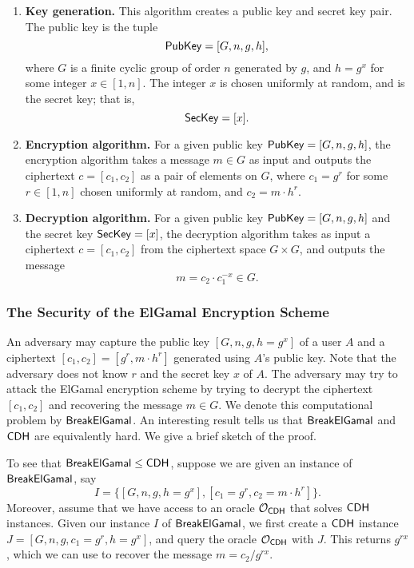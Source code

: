 \begin{enumerate}
    \item {\bf Key generation.} This algorithm creates a public key and secret key 
          pair. The public key is the tuple 
          \[ {\sf PubKey} = [G, n, g, h], \] 
          where $G$ is a finite cyclic group of order $n$ generated by $g$, and 
          $h = g^x$ for some integer $x \in [1, n]$. The integer $x$ is chosen 
          uniformly at random, and is the secret key; that is, 
          \[ {\sf SecKey} = [x]. \] 
    \item {\bf Encryption algorithm.} For a given public key ${\sf PubKey} = 
          [G, n, g, h]$, the encryption algorithm takes a message $m \in G$ as 
          input and outputs the ciphertext $c = [c_1, c_2]$ as a pair of elements 
          on $G$, where $c_1 = g^r$ for some $r \in [1, n]$ chosen uniformly 
          at random, and $c_2 = m \cdot h^r$. 
    \item {\bf Decryption algorithm.} For a given public key ${\sf PubKey} = 
          [G, n, g, h]$ and the secret key ${\sf SecKey} = [x]$, the decryption 
          algorithm takes as input a ciphertext $c = [c_1, c_2]$ from the 
          ciphertext space $G \times G$, and outputs the message 
          \[ m = c_2 \cdot c_1^{-x} \in G. \] 
\end{enumerate}

\subsubsection{The Security of the ElGamal Encryption Scheme}
An adversary may capture the public key $[G, n, g, h = g^x]$ of a user $A$ 
and a ciphertext $[c_1, c_2] = [g^r, m \cdot h^r]$ generated using $A$'s public 
key. Note that the adversary does not know $r$ and the secret key $x$ of $A$. 
The adversary may try to attack the ElGamal encryption scheme by trying to 
decrypt the ciphertext $[c_1, c_2]$ and recovering the message $m \in G$. 
We denote this computational problem by ${\sf BreakElGamal}$. An interesting 
result tells us that ${\sf BreakElGamal}$ and ${\sf CDH}$ are equivalently hard. 
We give a brief sketch of the proof. 

To see that ${\sf BreakElGamal} \leq {\sf CDH}$, suppose we are given an instance 
of ${\sf BreakElGamal}$, say 
\[ I = \{[G, n, g, h = g^x], [c_1 = g^r, c_2 = m \cdot h^r]\}. \] 
Moreover, assume that we have access to an oracle ${\cal O}_{{\sf CDH}}$ that solves 
${\sf CDH}$ instances. Given our instance $I$ of ${\sf BreakElGamal}$, we first create 
a ${\sf CDH}$ instance $J = [G, n, g, c_1 = g^r, h = g^x]$, and query the 
oracle ${\cal O}_{{\sf CDH}}$ with $J$. This returns $g^{rx}$, which we can use 
to recover the message $m = c_2/g^{rx}$. 

